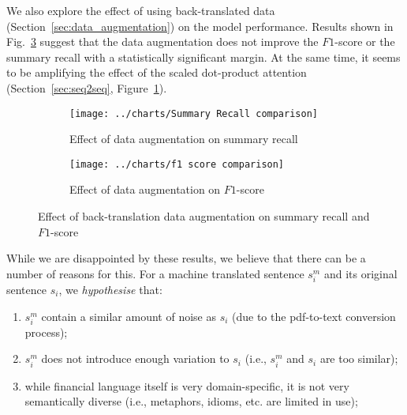 We also explore the effect of using back-translated data (Section~\ref{sec:data_augmentation}) on the model performance.
Results shown in Fig.~\ref{fig:data_augmentation_effect} suggest that the data augmentation does not improve the $F1$-score or the summary recall with a statistically significant margin.
At the same time, it seems to be amplifying the effect of the scaled dot-product attention (Section~\ref{sec:seq2seq}, Figure~\ref{fig:summary_recall_data_augmentation_effect}).
\begin{figure}[ht]
    \begin{subfigure}{0.49\textwidth}
        \centering \texttt{[image: ../charts/Summary Recall comparison]}
        \caption{Effect of data augmentation on summary recall}
        \label{fig:summary_recall_data_augmentation_effect}
    \end{subfigure}%
    \hfill
    \begin{subfigure}{0.49\textwidth}
        \centering
        \texttt{[image: ../charts/f1 score comparison]}
        \caption{Effect of data augmentation on $F1$-score}
        \label{fig:f1_score_comparison_data_augmentation_effect}
    \end{subfigure}
    \caption{Effect of back-translation data augmentation on summary recall and $F1$-score}
    \label{fig:data_augmentation_effect}
\end{figure}
While we are disappointed by these results, we believe that there can be a number of reasons for this.
For a machine translated sentence $s^m_i$ and its original sentence $s_i$, we \hypertarget{data_augment_hypothesis}{\emph{hypothesise}} that:
\begin{enumerate}
    \item $s^m_i$ contain a similar amount of noise as $s_i$ (due to the pdf-to-text conversion process);
    \item $s^m_i$ does not introduce enough variation to $s_i$ (i.e., $s^m_i$ and $s_i$ are too similar);
    \item while financial language itself is very domain-specific, it is not very semantically diverse (i.e., metaphors, idioms, etc.
    are limited in use);
\end{enumerate}

